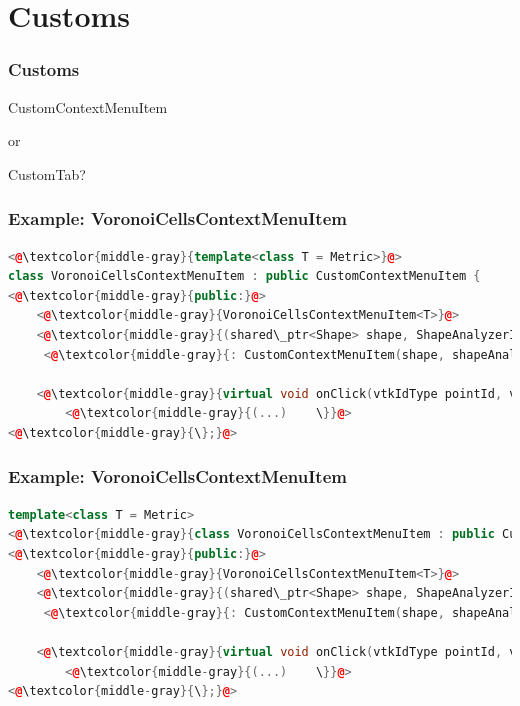 \documentclass[compress]{beamer}
\begin{document}
\section{Customs}

\begin{frame}[c]
  \frametitle{Customs}
  \begin{center}
  
  \huge CustomContextMenuItem 
  
  \vspace{1em}
  
  or 
  
  \vspace{1em}
  
  CustomTab?
  \end{center}
\end{frame}

\begin{frame}[fragile]
  \frametitle{Example: VoronoiCellsContextMenuItem}
  
\begin{lstlisting}[language=C++, numbers=none]
<@\textcolor{middle-gray}{template<class T = Metric>}@>
class VoronoiCellsContextMenuItem : public CustomContextMenuItem {
<@\textcolor{middle-gray}{public:}@>
	<@\textcolor{middle-gray}{VoronoiCellsContextMenuItem<T>}@>
	<@\textcolor{middle-gray}{(shared\_ptr<Shape> shape, ShapeAnalyzerInterface* shapeAnalyzer)}@>
	 <@\textcolor{middle-gray}{: CustomContextMenuItem(shape, shapeAnalyzer) \{ \}}@>
    
    <@\textcolor{middle-gray}{virtual void onClick(vtkIdType pointId, vtkIdType faceId, QWidget* parent) \{}@>
        <@\textcolor{middle-gray}{(...)    \}}@>
<@\textcolor{middle-gray}{\};}@>
\end{lstlisting}
  
\end{frame}

\begin{frame}[fragile]
  \frametitle{Example: VoronoiCellsContextMenuItem}
  
\begin{lstlisting}[language=C++, numbers=none]
template<class T = Metric>
<@\textcolor{middle-gray}{class VoronoiCellsContextMenuItem : public CustomContextMenuItem \{}@>
<@\textcolor{middle-gray}{public:}@>
	<@\textcolor{middle-gray}{VoronoiCellsContextMenuItem<T>}@>
	<@\textcolor{middle-gray}{(shared\_ptr<Shape> shape, ShapeAnalyzerInterface* shapeAnalyzer)}@>
	 <@\textcolor{middle-gray}{: CustomContextMenuItem(shape, shapeAnalyzer) \{ \}}@>
    
    <@\textcolor{middle-gray}{virtual void onClick(vtkIdType pointId, vtkIdType faceId, QWidget* parent) \{}@>
        <@\textcolor{middle-gray}{(...)    \}}@>
<@\textcolor{middle-gray}{\};}@>
\end{lstlisting}
  
\end{frame}
\end{document}
